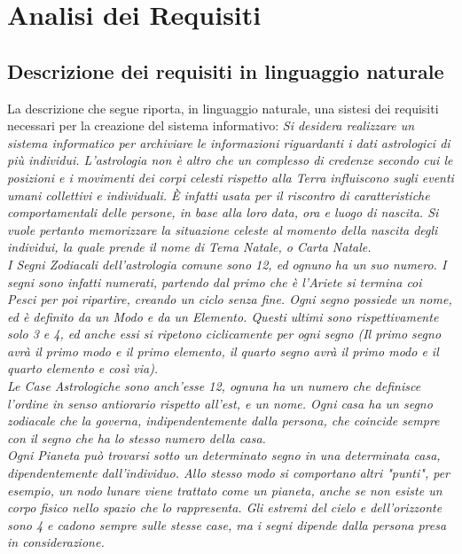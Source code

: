 \chapter{Analisi dei Requisiti}
\section{Descrizione dei requisiti in linguaggio naturale}
\label{sec:req}
La descrizione che segue riporta, in linguaggio naturale, una sistesi dei requisiti necessari per la creazione del sistema informativo:
\mline
\textit{
  Si desidera realizzare un sistema informatico per archiviare le informazioni riguardanti i dati astrologici di più individui.
  L'astrologia non è altro che un complesso di credenze secondo cui le posizioni e i movimenti dei corpi celesti rispetto alla Terra influiscono sugli eventi umani collettivi e individuali. È infatti usata per il riscontro di caratteristiche comportamentali delle persone, in base alla loro data, ora e luogo di nascita.%
  Si vuole pertanto memorizzare la situazione celeste al momento della nascita degli individui, la quale prende il nome di Tema Natale, o Carta Natale.\\
  I Segni Zodiacali dell'astrologia comune sono 12, ed ognuno ha un suo numero. I segni sono infatti numerati, partendo dal primo che è l'Ariete si termina coi Pesci per poi ripartire, creando un ciclo senza fine. Ogni segno possiede un nome, ed è definito da un Modo e da un Elemento. Questi ultimi sono rispettivamente solo 3 e 4, ed anche essi si ripetono ciclicamente per ogni segno (Il primo segno avrà il primo modo e il primo elemento, il quarto segno avrà il primo modo e il quarto elemento e così via).\\
  Le Case Astrologiche sono anch'esse 12, ognuna ha un numero che definisce l'ordine in senso antiorario rispetto all'est, e un nome.
  Ogni casa ha un segno zodiacale che la governa, indipendentemente dalla persona, che coincide sempre con il segno che ha lo stesso numero della casa.\\
  Ogni Pianeta può trovarsi sotto un determinato segno in una determinata casa, dipendentemente dall'individuo. Allo stesso modo si comportano altri "punti", per esempio, un nodo lunare viene trattato come un pianeta, anche se non esiste un corpo fisico nello spazio che lo rappresenta. Gli estremi del cielo e dell'orizzonte sono 4 e cadono sempre sulle stesse case, ma i segni dipende dalla persona presa in considerazione.\\
}
